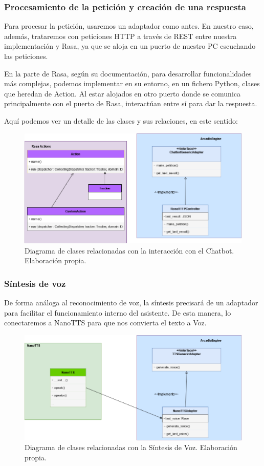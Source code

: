 \subsubsection{Procesamiento de la petición y creación de una respuesta}
Para procesar la petición, usaremos un adaptador como antes. En nuestro caso, además, trataremos con peticiones HTTP a través de REST entre nuestra implementación y Rasa, ya que se aloja en un puerto de nuestro PC escuchando las peticiones.

En la parte de Rasa, según su documentación, para desarrollar funcionalidades más complejas, podemos implementar en su entorno, en un fichero Python, clases que heredan de Action. Al estar alojados en otro puerto donde se comunica principalmente con el puerto de Rasa, interactúan entre sí para dar la respuesta.

Aquí podemos ver un detalle de las clases y sus relaciones, en este sentido:
\begin{figure}[H]
	\includegraphics[width=\textwidth]{imagenes/DiagramaClases_Chatbot.png}
	\caption{Diagrama de clases relacionadas con la interacción con el Chatbot. Elaboración propia.}
\end{figure}
\subsubsection{Síntesis de voz}
De forma análoga al reconocimiento de voz, la síntesis precisará de un adaptador para facilitar el funcionamiento interno del asistente. De esta manera, lo conectaremos a NanoTTS para que nos convierta el texto a Voz.

\begin{figure}[H]
	\includegraphics[width=\textwidth]{imagenes/DiagramaClases_TTS.png}
	\caption{Diagrama de clases relacionadas con la Síntesis de Voz. Elaboración propia.}
\end{figure}
